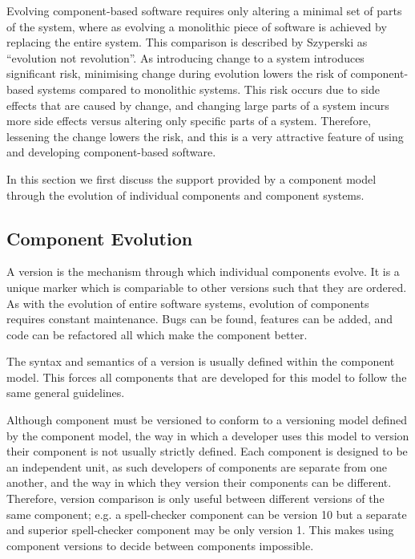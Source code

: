 Evolving component-based software requires only altering a minimal set of parts of the system, 
where as evolving a monolithic piece of software is achieved by replacing the entire system.
This comparison is described by Szyperski \cite{Szyperski2002} as ``evolution not revolution''.
As introducing change to a system introduces significant risk,
minimising change during evolution lowers the risk of component-based systems compared to monolithic systems. 
This risk occurs due to side effects that are caused by change, 
and changing large parts of a system incurs more side effects versus altering only specific parts of a system.
Therefore, lessening the change lowers the risk, and this is a very attractive feature of using and developing component-based software.


{}In this section we first discuss the support provided by a component model through the evolution of individual components and component systems.

\subsection{Component Evolution}

A version is the mechanism through which individual components evolve.
It is a unique marker which is compariable to other versions such that they are ordered.
As with the evolution of entire software systems, evolution of components requires constant maintenance.
Bugs can be found, features can be added, and code can be refactored all which make the component better.

The syntax and semantics of a version is usually defined within the component model.
This forces all components that are developed for this model to follow the same general guidelines.

Although component must be versioned to conform to a versioning model defined by the component model, 
the way in which a developer uses this model to version their component is not usually strictly defined.
Each component is designed to be an independent unit, as such developers of components are separate from one another,
and the way in which they version their components can be different.
Therefore, version comparison is only useful between different versions of the same component;
e.g. a spell-checker component can be version 10 but a separate and superior spell-checker component may be only version 1.
This makes using component versions to decide between components impossible.

